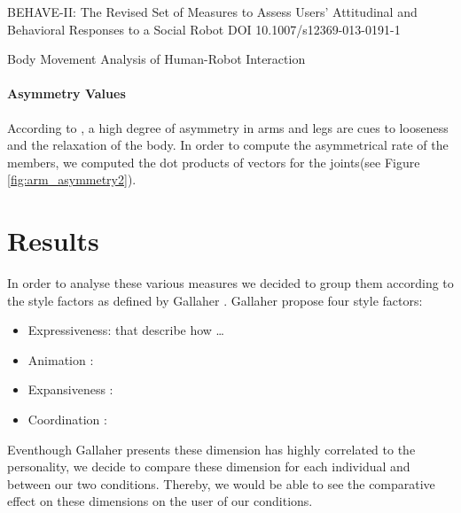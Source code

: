 \documentclass[a4paper,twocolumn]{svjour3}
\begin{document}
BEHAVE-II: The Revised Set of Measures to Assess Users’
Attitudinal and Behavioral Responses to a Social Robot
DOI 10.1007/s12369-013-0191-1

Body Movement Analysis of Human-Robot Interaction



\paragraph{Asymmetry Values}
According to \cite{Mehrabian}, a high degree of asymmetry in arms and legs are cues to looseness and the relaxation of the body.
In order to compute the asymmetrical rate of the members, we computed the dot products of vectors for the joints(see Figure \ref{fig:arm_asymmetry2}). 










\section{Results}
In order to analyse these various measures we decided to group them according to the style factors as defined by Gallaher \cite{Gallaher1992}. 
Gallaher propose four style factors: 
\begin{itemize}
\item Expressiveness: that describe how \dots
\item Animation :
\item Expansiveness : 
\item Coordination : 
\end{itemize}
Eventhough Gallaher presents these dimension has highly correlated to the personality, we decide to compare these dimension for each individual and between our two conditions. 
Thereby, we would be able to see the comparative effect on these dimensions on the user of our conditions. 
\end{document}
